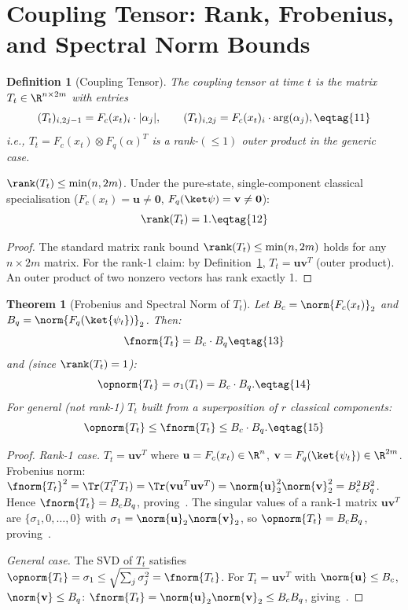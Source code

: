 \documentclass[11pt,letterpaper]{article}
\newtheorem{definition}{Definition}[section]
\newtheorem{theorem}{Theorem}[section]
\begin{document}
\section{Coupling Tensor: Rank, Frobenius, and Spectral Norm Bounds}
\label{sec:T}

\begin{definition}[Coupling Tensor]\label{def:T}
The \emph{coupling tensor} at time $t$ is the matrix $T_t \in \R^{n \times 2m}$
with entries
\[
  (T_t)_{i,2j-1} = F_c(x_t)_i \cdot |\alpha_j|,
  \qquad
  (T_t)_{i,2j} = F_c(x_t)_i \cdot \arg(\alpha_j), \eqtag{11}
\]
i.e., $T_t = F_c(x_t) \otimes F_q(\alpha)^T$ is a rank-$(\leq 1)$ outer
product in the generic case.
\end{definition}

\begin{lemma}\label{lem:T-rank}
$\rank(T_t) \leq \min(n, 2m)$.
Under the pure-state, single-component classical specialisation
($F_c(x_t) = \mathbf{u} \neq \mathbf{0}$, $F_q(\ket\psi) = \mathbf{v} \neq \mathbf{0}$):
\[
  \rank(T_t) = 1. \eqtag{12}
\]
\end{lemma}

\begin{proof}
The standard matrix rank bound $\rank(T_t)\leq\min(n,2m)$ holds for any
$n\times 2m$ matrix.
For the rank-1 claim: by Definition~\ref{def:T}, $T_t = \mathbf{u}\mathbf{v}^T$
(outer product). An outer product of two nonzero vectors has rank exactly 1.
\end{proof}

\begin{theorem}[Frobenius and Spectral Norm of $T_t$]\label{thm:T-norm}
Let $B_c = \norm{F_c(x_t)}_2$ and $B_q = \norm{F_q(\ket{\psi_t})}_2$.
Then:
\[
  \fnorm{T_t} = B_c \cdot B_q \eqtag{13}
\]
and (since $\rank(T_t) = 1$):
\[
  \opnorm{T_t} = \sigma_1(T_t) = B_c \cdot B_q. \eqtag{14}
\]
For general (not rank-1) $T_t$ built from a superposition of $r$ classical
components:
\[
  \opnorm{T_t} \leq \fnorm{T_t} \leq B_c \cdot B_q. \eqtag{15}
\]
\end{theorem}

\begin{proof}
\textit{Rank-1 case.}
$T_t = \mathbf{u}\mathbf{v}^T$ where $\mathbf{u} = F_c(x_t) \in \R^n$,
$\mathbf{v} = F_q(\ket{\psi_t}) \in \R^{2m}$.
Frobenius norm:
$\fnorm{T_t}^2 = \Tr(T_t^T T_t) = \Tr(\mathbf{v}\mathbf{u}^T\mathbf{u}\mathbf{v}^T)
  = \norm{\mathbf{u}}_2^2 \norm{\mathbf{v}}_2^2 = B_c^2 B_q^2$.
Hence $\fnorm{T_t} = B_c B_q$, proving~.
The singular values of a rank-1 matrix $\mathbf{u}\mathbf{v}^T$ are
$\{\sigma_1, 0, \ldots, 0\}$ with $\sigma_1 = \norm{\mathbf{u}}_2\norm{\mathbf{v}}_2$,
so $\opnorm{T_t} = B_c B_q$, proving~.

\textit{General case.}
The SVD of $T_t$ satisfies $\opnorm{T_t} = \sigma_1 \leq \sqrt{\sum_j \sigma_j^2} = \fnorm{T_t}$.
For $T_t = \mathbf{u}\mathbf{v}^T$ with $\norm{\mathbf{u}}\leq B_c$, $\norm{\mathbf{v}}\leq B_q$:
$\fnorm{T_t} = \norm{\mathbf{u}}_2\norm{\mathbf{v}}_2 \leq B_c B_q$, giving~.
\end{proof}
\end{document}
